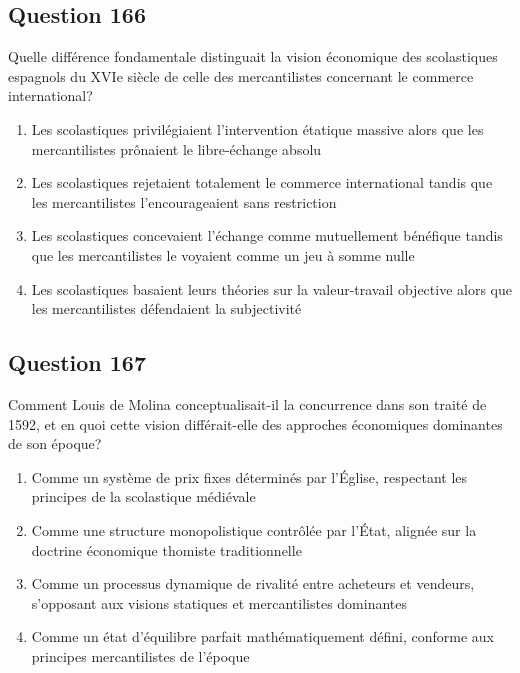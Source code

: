 \documentclass[12pt,a4paper]{article}
\begin{document}
\subsection*{Question 166}
Quelle différence fondamentale distinguait la vision économique des scolastiques espagnols du XVIe siècle de celle des mercantilistes concernant le commerce international?

\begin{enumerate}[label=\Alph*., leftmargin=*]
\item Les scolastiques privilégiaient l'intervention étatique massive alors que les mercantilistes prônaient le libre-échange absolu
\item Les scolastiques rejetaient totalement le commerce international tandis que les mercantilistes l'encourageaient sans restriction
\item Les scolastiques concevaient l'échange comme mutuellement bénéfique tandis que les mercantilistes le voyaient comme un jeu à somme nulle
\item Les scolastiques basaient leurs théories sur la valeur-travail objective alors que les mercantilistes défendaient la subjectivité
\end{enumerate}

\bigskip


\subsection*{Question 167}
Comment Louis de Molina conceptualisait-il la concurrence dans son traité de 1592, et en quoi cette vision différait-elle des approches économiques dominantes de son époque?

\begin{enumerate}[label=\Alph*., leftmargin=*]
\item Comme un système de prix fixes déterminés par l'Église, respectant les principes de la scolastique médiévale
\item Comme une structure monopolistique contrôlée par l'État, alignée sur la doctrine économique thomiste traditionnelle
\item Comme un processus dynamique de rivalité entre acheteurs et vendeurs, s'opposant aux visions statiques et mercantilistes dominantes
\item Comme un état d'équilibre parfait mathématiquement défini, conforme aux principes mercantilistes de l'époque
\end{enumerate}

\bigskip
\end{document}
